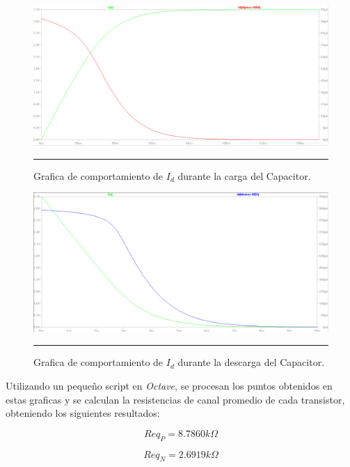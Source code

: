 \documentclass[12pt,a4paper]{article} %
\begin{document}
\begin{figure}[htbp]
  \centering
    \includegraphics[scale=0.3]{./Grafica_R_PMOS.png}
   \rule{35em}{0.3pt}
  \caption[G_Carga]{Grafica de comportamiento de $\textit{I}_{\textit{d}}$ durante la carga del Capacitor.}
  \label{fig:Grafica_R_PMOS}
\end{figure}

\begin{figure}[htbp]
 \centering
    \includegraphics[scale=0.3]{./Grafica_R_NMOS.png}
    \rule{35em}{0.3pt}
  \caption[G_Descarga]{Grafica de comportamiento de $\textit{I}_{\textit{d}}$ durante la descarga del Capacitor.}
  \label{fig:Grafica_R_NMOS}
\end{figure}

Utilizando un pequeño script en \textit{Octave}, se procesan los puntos obtenidos en estas graficas y se calculan la resistencias de canal promedio de cada transistor, obteniendo los siguientes resultados:

\begin{equation}\label{eqn:R_PMOS}
Req_P = 8.7860k\Omega
\end{equation}

\begin{equation}\label{eqn:R_NMOS}
Req_N = 2.6919k\Omega
\end{equation}
\end{document}
